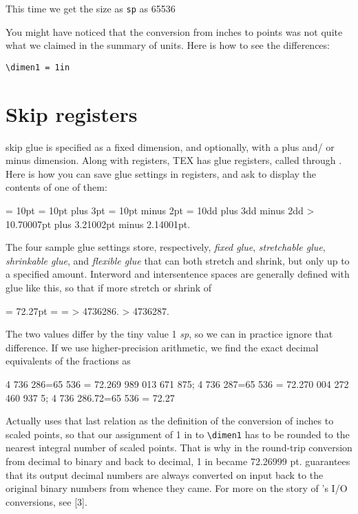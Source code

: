 {\noindent This time we get the size as \texttt{sp} as 65536 }


You might have noticed that the conversion from inches to points was not
quite what we claimed in the summary of \tex units. Here is how to see the
differences:

\verb+\dimen1 = 1in+


\section{Skip registers}
\begin{docCommand}{skip}{}
\tex glue is specified as a fixed dimension, and optionally, with a plus and/
or minus dimension. Along with  registers, TEX has glue registers,
called  through . Here is how you can save glue settings in
 registers, and ask \tex to display the contents of one of them:
\end{docCommand}

\begin{teX}
   = 10pt
   = 10pt plus 3pt
   = 10pt minus 2pt
   = 10dd plus 3dd minus 2dd
  \showthe {}
  > 10.70007pt plus 3.21002pt minus 2.14001pt.
\end{teX}


The four sample glue settings store, respectively, \textit{fixed glue}, \textit{stretchable
glue}, \textit{shrinkable glue}, and \textit{flexible glue} that can both stretch and shrink,
but only up to a specified amount. Interword and intersentence spaces are
generally defined with glue like this, so that if more stretch or shrink of

\begin{teX}
 = 72.27pt
 = 
 = 
\showthe {}
> 4736286.
\showthe {}
> 4736287.
\end{teX}

The two values differ by the tiny value 1 \textit{sp}, so we can in practice ignore
that difference. If we use higher-precision arithmetic, we find the exact
decimal equivalents of the fractions as

\begin{teX}
4 736 286=65 536 = 72.269 989 013 671 875;
4 736 287=65 536 = 72.270 004 272 460 937 5;
4 736 286.72=65 536 = 72.27
\end{teX}


Actually \tex uses that last relation as the definition of the conversion of
inches to scaled points, so that our assignment of 1 in to \verb+\dimen1+ has to
be rounded to the nearest integral number of scaled points. That is why
in the round-trip conversion from decimal to binary and back to decimal,
1 in became 72.26999 pt. \tex guarantees that its output decimal numbers
are always converted on input back to the original binary numbers from
whence they came. For more on the story of \tex’s I/O conversions, see [3].



